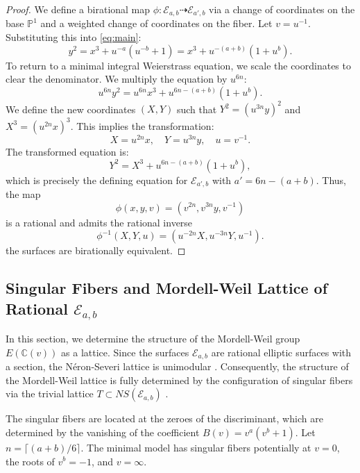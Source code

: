 \documentclass[11pt]{amsart}
\newcommand{\Pp}{{\mathbb P}}
\newcommand{\CC}{{\mathbb C}}
\newcommand{\Ee}{{\mathcal E}}
\newtheorem{rem}[thm]{Remark}
\numberwithin{equation}{section}
\numberwithin{table}{section}
\newcommand\<{\langle}
\begin{document}
\begin{proof}
	We define a birational map $\phi: \Ee_{a,b} \dashrightarrow \Ee_{a', b}$ via a change of coordinates on the base $\Pp^1$ and a weighted change of coordinates on the fiber.
	Let $v = u^{-1}$. Substituting this into \eqref{eq:main}:
	\[
	y^2 = x^3 + u^{-a}(u^{-b}+1) = x^3 + u^{-(a+b)}(1+u^b).
	\]
	To return to a minimal integral Weierstrass equation, we scale the coordinates to clear the denominator. We multiply the equation by $u^{6n}$:
	\[
	u^{6n} y^2 = u^{6n} x^3 + u^{6n - (a+b)}(1+u^b).
	\]
	We define the new coordinates $(X, Y)$ such that $Y^2 = (u^{3n} y)^2$ and $X^3 = (u^{2n} x)^3$. This implies the transformation:
	\[
	X = u^{2n} x, \quad Y = u^{3n} y, \quad u = v^{-1}.
	\]
	The transformed equation is:
	\[
	Y^2 = X^3 + u^{6n - (a+b)}(1+u^b),
	\]
	which is precisely the defining equation for $\Ee_{a', b}$ with $a' = 6n - (a+b)$. Thus, the map 
	 $$\phi(x, y, v) = (v^{2n} , v^{3n} y, v^{-1})$$ is a 
	 rational and admits the rational inverse
	  $$\phi^{-1}(X, Y, u) = (u^{-2n}X, u^{-3n}Y, u^{-1}).$$
	  the surfaces are birationally equivalent.
\end{proof}


\subsection{Singular Fibers and Mordell-Weil Lattice of Rational $\Ee_{a,b}$}

In this section, we determine the structure of the Mordell-Weil group $E(\CC(v))$ as a lattice. Since the surfaces $\Ee_{a,b}$ are rational elliptic surfaces with a section, the Néron-Severi lattice is unimodular \cite[Prop. 7.1]{Schuett2019}. Consequently, the structure of the Mordell-Weil lattice is fully determined by the configuration of singular fibers via the trivial lattice $T \subset NS(\Ee_{a,b})$ \cite[Thm. 8.6]{Schuett2019}.

The singular fibers are located at the zeroes of the discriminant, which are determined by the vanishing of the coefficient $B(v) = v^a(v^b+1)$. Let $n = \lceil (a+b)/6 \rceil$. The minimal model has singular fibers potentially at $v=0$, the roots of $v^b=-1$, and $v=\infty$.
\end{document}
